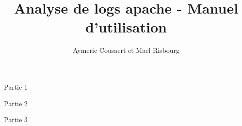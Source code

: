 \documentclass{article}
\date{}
\title{Analyse de logs apache - Manuel d'utilisation}
\author{Aymeric Cousaert et Mael Risbourg}
\begin{document}
\maketitle

\vspace{1cm}
\tableofcontents
\vspace{1cm}

\begin{section}{Partie 1}

\end{section}






\begin{section}{Partie 2}

\end{section}



\begin{section}{Partie 3}

\end{section}
\end{document}
